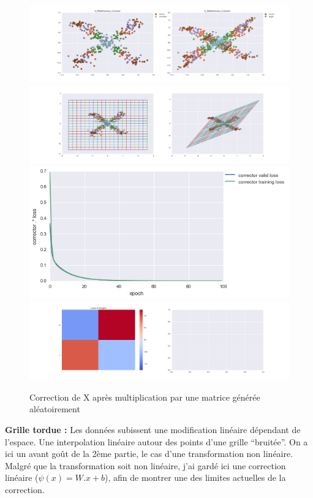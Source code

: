\begin{figure}[H] %
\centering
\includegraphics[width=\linewidth]{fig/24-05-2016/X/X_RMatPairwise_Corrector-DATA.png}
\includegraphics[width=\linewidth]{fig/24-05-2016/X/X_RMatPairwise_Corrector-GridCheck.png}
\includegraphics[width=0.45\linewidth]{fig/24-05-2016/X/X_RMatPairwise_Corrector-Learning_curve.png}
\includegraphics[width=\linewidth]{fig/24-05-2016/X/X_RMatPairwise_Corrector-W.png}
\caption{Correction de X après multiplication par une matrice générée aléatoirement}
\label{fig:recap-X-RMat-pairwise}
\end{figure}


{\Large \textbf{Grille tordue :}} Les données subissent une modification linéaire dépendant de l'espace.
Une interpolation linéaire autour des points d'une grille ``bruitée''.
On a ici un avant goût de la 2ème partie, le cas d'une transformation non linéaire.
Malgré que la transformation soit non linéaire, j'ai gardé ici une correction linéaire ($\psi(x) = W.x+b$),
afin de montrer une des limites actuelles de la correction.

